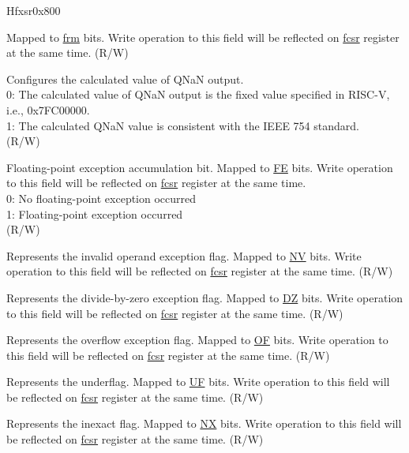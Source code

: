 \begin{register}{H}{fxsr}{0x800}\label{regdesc:FXCR}
%
%
%
%
%
%
%
%
%
%
\regnewline%
\begin{regdesc}\begin{reglist}
\label{fielddesc:RM}\item [RM] Mapped to \hyperref[regdesc:FCSR]{frm} bits. Write operation to this field will be reflected on \hyperref[regdesc:FCSR]{fcsr} register at the same time. (R/W)
\label{fielddesc:DQNaN}\item [DQNaN] Configures the calculated value of QNaN output. \\
0: The calculated value of QNaN output is the fixed value specified in RISC-V, i.e., 0x7FC00000. \\
1: The calculated QNaN value is consistent with the IEEE 754 standard.\\
(R/W)
\label{fielddesc:FE}\item [FE] Floating-point exception accumulation bit. Mapped to \hyperref[regdesc:FCSR]{FE} bits. Write operation to this field will be reflected on \hyperref[regdesc:FCSR]{fcsr} register at the same time.\\
0: No floating-point exception occurred \\
1: Floating-point exception occurred\\
(R/W)
\label{fielddesc:NV}\item [NV] Represents the invalid operand exception flag. Mapped to \hyperref[regdesc:FCSR]{NV} bits. Write operation to this field will be reflected on \hyperref[regdesc:FCSR]{fcsr} register at the same time. (R/W)
\label{fielddesc:DZ}\item [DZ] Represents the divide-by-zero exception flag. Mapped to \hyperref[regdesc:FCSR]{DZ} bits. Write operation to this field will be reflected on \hyperref[regdesc:FCSR]{fcsr} register at the same time. (R/W)
\label{fielddesc:OF}\item [OF] Represents the overflow exception flag. Mapped to \hyperref[regdesc:FCSR]{OF} bits. Write operation to this field will be reflected on \hyperref[regdesc:FCSR]{fcsr} register at the same time. (R/W)
\label{fielddesc:UF}\item [UF] Represents the underflag. Mapped to \hyperref[regdesc:FCSR]{UF} bits. Write operation to this field will be reflected on \hyperref[regdesc:FCSR]{fcsr} register at the same time. (R/W)
\label{fielddesc:NX}\item [NX] Represents the inexact flag. Mapped to \hyperref[regdesc:FCSR]{NX} bits. Write operation to this field will be reflected on \hyperref[regdesc:FCSR]{fcsr} register at the same time. (R/W)
\end{reglist}\end{regdesc}
\end{register}

